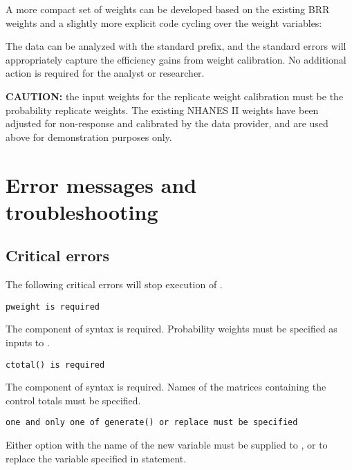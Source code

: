 \begin{stexample}[Example 6]
A more compact set of weights can be developed based on the existing
BRR weights and a slightly more explicit code cycling over the weight
variables:

\begin{stlog}
\nullskip
\end{stlog}

The data can be analyzed with the standard  prefix,
and the standard errors will appropriately capture the efficiency
gains from weight calibration. No additional action is required
for the analyst or researcher.

\end{stexample}

{\bf CAUTION:} the input weights for the replicate weight calibration
must be the probability replicate weights. The existing NHANES II weights
have been adjusted for non-response and calibrated by the data provider,
and are used above for demonstration purposes only.

\section{Error messages and troubleshooting}
\label{subsec:tbshooting}

\subsection{Critical errors}

The following critical errors will stop execution of
.

\noindent
{\tt pweight is required}

\morehang
    The \stcmd{[pweight=\ldots]} component of 
    syntax is required. Probability weights must be specified as
    inputs to .

\noindent
    {\tt ctotal() is required}

    \morehang
    The  component of 
    syntax is required. Names of the matrices containing the
    control totals must be specified.

    \noindent
    {\tt one and only one of generate() or replace must be specified}

    \morehang
    Either  option with the name of the new variable
    must be supplied to , or  to replace
    the variable specified in \stcmd{[pw=\ldots]} statement.


